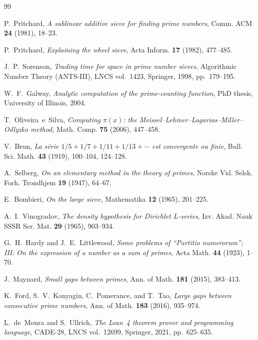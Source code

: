 \documentclass[11pt]{amsart}
\numberwithin{equation}{section}
\theoremstyle{plain}
\theoremstyle{definition}
\begin{document}
\begin{thebibliography}{99}

P.~Pritchard,
\emph{A sublinear additive sieve for finding prime numbers},
Comm. ACM \textbf{24} (1981), 18--23.

P.~Pritchard,
\emph{Explaining the wheel sieve},
Acta Inform. \textbf{17} (1982), 477--485.

J.~P.~Sorenson,
\emph{Trading time for space in prime number sieves},
Algorithmic Number Theory (ANTS-III), LNCS vol.~1423, Springer, 1998,
pp.~179--195.

W.~F.~Galway,
\emph{Analytic computation of the prime-counting function},
PhD thesis, University of Illinois, 2004.

T.~Oliveira~e~Silva,
\emph{Computing $\pi(x)$: the Meissel--Lehmer--Lagarias--Miller--Odlyzko method},
Math. Comp. \textbf{75} (2006), 447--458.

V.~Brun,
\emph{La s\'erie $1/5+1/7+1/11+1/13+\cdots$ est convergente ou finie},
Bull. Sci. Math. \textbf{43} (1919), 100--104, 124--128.

A.~Selberg,
\emph{On an elementary method in the theory of primes},
Norske Vid. Selsk. Forh. Trondhjem \textbf{19} (1947), 64--67.

E.~Bombieri,
\emph{On the large sieve},
Mathematika \textbf{12} (1965), 201--225.

A.~I.~Vinogradov,
\emph{The density hypothesis for Dirichlet $L$-series},
Izv. Akad. Nauk SSSR Ser. Mat. \textbf{29} (1965), 903--934.

G.~H.~Hardy and J.~E.~Littlewood,
\emph{Some problems of ``Partitio numerorum''; III: On the expression
of a number as a sum of primes},
Acta Math. \textbf{44} (1923), 1--70.

J.~Maynard,
\emph{Small gaps between primes},
Ann. of Math. \textbf{181} (2015), 383--413.

K.~Ford, S.~V.~Konyagin, C.~Pomerance, and T.~Tao,
\emph{Large gaps between consecutive prime numbers},
Ann. of Math. \textbf{183} (2016), 935--974.

L.~de~Moura and S.~Ullrich,
\emph{The Lean~4 theorem prover and programming language},
CADE-28, LNCS vol.~12699, Springer, 2021, pp.~625--635.


\end{thebibliography}
\end{document}
